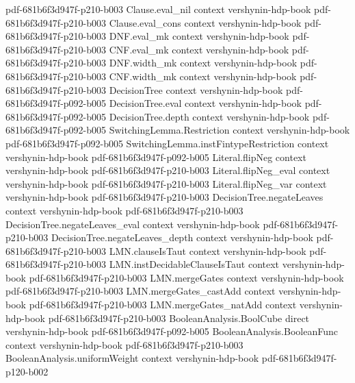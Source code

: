 \begin{theorem}
  {pdf-681b6f3d947f-p210-b003}
\proofstep
  {Clause.eval_nil}
  {context}
  {vershynin-hdp-book}
  {pdf-681b6f3d947f-p210-b003}
\proofstep
  {Clause.eval_cons}
  {context}
  {vershynin-hdp-book}
  {pdf-681b6f3d947f-p210-b003}
\proofstep
  {DNF.eval_mk}
  {context}
  {vershynin-hdp-book}
  {pdf-681b6f3d947f-p210-b003}
\proofstep
  {CNF.eval_mk}
  {context}
  {vershynin-hdp-book}
  {pdf-681b6f3d947f-p210-b003}
\proofstep
  {DNF.width_mk}
  {context}
  {vershynin-hdp-book}
  {pdf-681b6f3d947f-p210-b003}
\proofstep
  {CNF.width_mk}
  {context}
  {vershynin-hdp-book}
  {pdf-681b6f3d947f-p210-b003}
\proofstep
  {DecisionTree}
  {context}
  {vershynin-hdp-book}
  {pdf-681b6f3d947f-p092-b005}
\proofstep
  {DecisionTree.eval}
  {context}
  {vershynin-hdp-book}
  {pdf-681b6f3d947f-p092-b005}
\proofstep
  {DecisionTree.depth}
  {context}
  {vershynin-hdp-book}
  {pdf-681b6f3d947f-p092-b005}
\proofstep
  {SwitchingLemma.Restriction}
  {context}
  {vershynin-hdp-book}
  {pdf-681b6f3d947f-p092-b005}
\proofstep
  {SwitchingLemma.instFintypeRestriction}
  {context}
  {vershynin-hdp-book}
  {pdf-681b6f3d947f-p092-b005}
\proofstep
  {Literal.flipNeg}
  {context}
  {vershynin-hdp-book}
  {pdf-681b6f3d947f-p210-b003}
\proofstep
  {Literal.flipNeg_eval}
  {context}
  {vershynin-hdp-book}
  {pdf-681b6f3d947f-p210-b003}
\proofstep
  {Literal.flipNeg_var}
  {context}
  {vershynin-hdp-book}
  {pdf-681b6f3d947f-p210-b003}
\proofstep
  {DecisionTree.negateLeaves}
  {context}
  {vershynin-hdp-book}
  {pdf-681b6f3d947f-p210-b003}
\proofstep
  {DecisionTree.negateLeaves_eval}
  {context}
  {vershynin-hdp-book}
  {pdf-681b6f3d947f-p210-b003}
\proofstep
  {DecisionTree.negateLeaves_depth}
  {context}
  {vershynin-hdp-book}
  {pdf-681b6f3d947f-p210-b003}
\proofstep
  {LMN.clauseIsTaut}
  {context}
  {vershynin-hdp-book}
  {pdf-681b6f3d947f-p210-b003}
\proofstep
  {LMN.instDecidableClauseIsTaut}
  {context}
  {vershynin-hdp-book}
  {pdf-681b6f3d947f-p210-b003}
\proofstep
  {LMN.mergeGates}
  {context}
  {vershynin-hdp-book}
  {pdf-681b6f3d947f-p210-b003}
\proofstep
  {LMN.mergeGates_castAdd}
  {context}
  {vershynin-hdp-book}
  {pdf-681b6f3d947f-p210-b003}
\proofstep
  {LMN.mergeGates_natAdd}
  {context}
  {vershynin-hdp-book}
  {pdf-681b6f3d947f-p210-b003}
\proofstep
  {BooleanAnalysis.BoolCube}
  {direct}
  {vershynin-hdp-book}
  {pdf-681b6f3d947f-p092-b005}
\proofstep
  {BooleanAnalysis.BooleanFunc}
  {context}
  {vershynin-hdp-book}
  {pdf-681b6f3d947f-p210-b003}
\proofstep
  {BooleanAnalysis.uniformWeight}
  {context}
  {vershynin-hdp-book}
  {pdf-681b6f3d947f-p120-b002}
\proofstep

\end{theorem}
